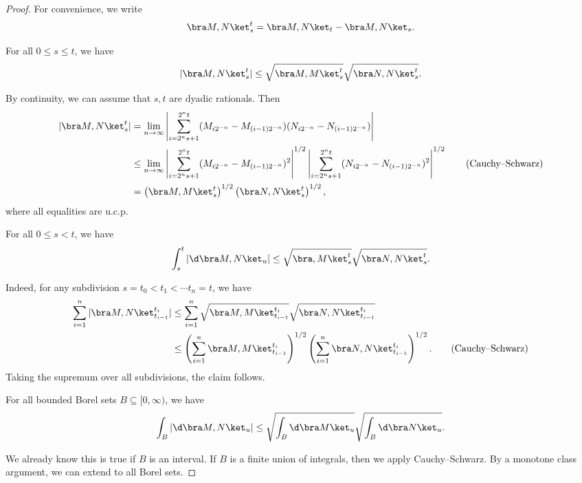 \documentclass[a4paper]{article}
\begin{document}
\begin{proof}
  For convenience, we write
  \[
    \bra M, N\ket_s^t = \bra M, N\ket_t - \bra M, N\ket_s.
  \]
  \begin{claim}
    For all $0 \leq s \leq t$, we have
    \[
      |\bra M, N\ket_s^t| \leq \sqrt{\bra M, M\ket_s^t} \sqrt{\bra N, N\ket_s^t}.
    \]
  \end{claim}
  By continuity, we can assume that $s, t$ are dyadic rationals. Then
  \begin{align*}
    |\bra M, N\ket_s^t| &= \lim_{n \to \infty} \left| \sum_{i = 2^ns + 1}^{2^n t} (M_{i 2^{-n}} - M_{(i - 1)2^{-n}})(N_{i 2^{-n}} -N_{(i - 1)2^{-n}})\right|\\
    &\leq \lim_{n \to \infty} \left| \sum_{i = 2^ns + 1}^{2^n t} (M_{i 2^{-n}} - M_{(i - 1)2^{-n}})^2\right|^{1/2}\left| \sum_{i = 2^n s + 1}^{2^n t} (N_{i 2^{-n}} - N_{(i - 1)2^{-n}})^2\right|^{1/2}\tag{Cauchy--Schwarz}\\
    &= \left(\bra M, M\ket_s^t \right)^{1/2}\left(\bra N, N\ket_s^t\right)^{1/2},
  \end{align*}
  where all equalities are u.c.p.

  \begin{claim}
    For all $0 \leq s < t$, we have
    \[
      \int_s^t |\d \bra M, N\ket_u| \leq \sqrt{\bra , M\ket_s^t}\sqrt{\bra N, N\ket_s^t}.
    \]
  \end{claim}
  Indeed, for any subdivision $s = t_0 < t_1 < \cdots t_n = t$, we have
  \begin{align*}
    \sum_{i = 1}^n |\bra M, N\ket_{t_{i - 1}}^{t_i}| &\leq \sum_{i = 1}^n \sqrt{\bra M, M\ket_{t_{i - 1}}^{t_i}} \sqrt{\bra N, N\ket_{t_{i - 1}}^{t_i}}\\
    &\leq \left(\sum_{i = 1}^n \bra M, M\ket_{t_{i - 1}}^{t_i}\right)^{1/2} \left(\sum_{i = 1}^n \bra N, N\ket_{t_{i - 1}}^{t_i}\right)^{1/2}. \tag{Cauchy--Schwarz}
  \end{align*}
  Taking the supremum over all subdivisions, the claim follows.

  \begin{claim}
    For all bounded Borel sets $B \subseteq [0, \infty)$, we have
    \[
      \int_B |\d \bra M, N\ket_u| \leq \sqrt{\int_B \d \bra M\ket_u} \sqrt{\int_B \d \bra N\ket_u}.
    \]
  \end{claim}
  We already know this is true if $B$ is an interval. If $B$ is a finite union of integrals, then we apply Cauchy--Schwarz. By a monotone class argument, we can extend to all Borel sets.


\end{proof}
\end{document}
